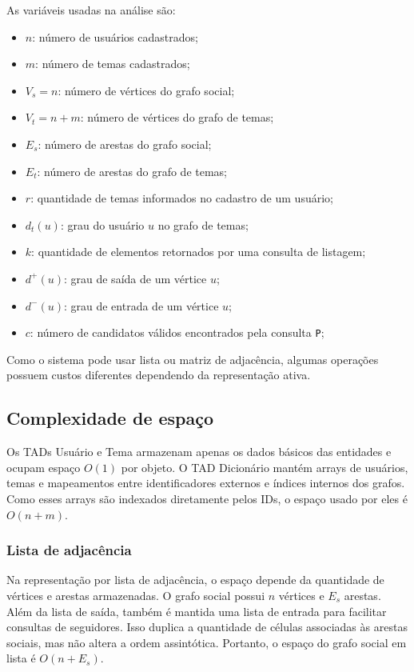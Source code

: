 \documentclass[12pt,a4paper]{article}
\begin{document}
As variáveis usadas na análise são:

\begin{itemize}
    \item $n$: número de usuários cadastrados;
    \item $m$: número de temas cadastrados;
    \item $V_s = n$: número de vértices do grafo social;
    \item $V_t = n + m$: número de vértices do grafo de temas;
    \item $E_s$: número de arestas do grafo social;
    \item $E_t$: número de arestas do grafo de temas;
    \item $r$: quantidade de temas informados no cadastro de um usuário;
\item $d_t(u)$: grau do usuário $u$ no grafo de temas;
    \item $k$: quantidade de elementos retornados por uma consulta de listagem;
    \item $d^+(u)$: grau de saída de um vértice $u$;
    \item $d^-(u)$: grau de entrada de um vértice $u$;
    \item $c$: número de candidatos válidos encontrados pela consulta \texttt{P};
\end{itemize}

Como o sistema pode usar lista ou matriz de adjacência, algumas operações possuem custos
diferentes dependendo da representação ativa.

\subsection{Complexidade de espaço}

Os TADs Usuário e Tema armazenam apenas os dados básicos das entidades e ocupam
espaço $O(1)$ por objeto. O TAD Dicionário mantém arrays de usuários, temas e
mapeamentos entre identificadores externos e índices internos dos grafos. Como esses
arrays são indexados diretamente pelos IDs, o espaço usado por eles é $O(n + m)$.

\subsubsection{Lista de adjacência}

Na representação por lista de adjacência, o espaço depende da quantidade de vértices e
arestas armazenadas. O grafo social possui $n$ vértices e $E_s$ arestas. Além da lista de
saída, também é mantida uma lista de entrada para facilitar consultas de seguidores. Isso
duplica a quantidade de células associadas às arestas sociais, mas não altera a ordem
assintótica. Portanto, o espaço do grafo social em lista é $O(n + E_s)$.
\end{document}
